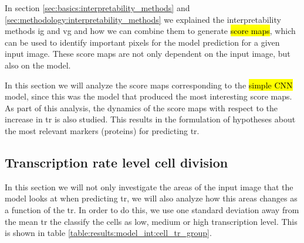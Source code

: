 
\glsresetall
\graphicspath{{./Sections/Results/Resources/}}

In section \ref{sec:basics:interpretability_methods} and \ref{sec:methodology:interpretability_methods} we explained the interpretability methods \gls{ig} and \gls{vg} and how we can combine them to generate \hl{score maps}, which can be used to identify important pixels for the model prediction for a given input image. These score maps are not only dependent on the input image, but also on the model.

In this section we will analyze the score maps corresponding to the \hl{simple CNN} model, since this was the model that produced the most interesting score maps. As part of this analysis, the dynamics of the score maps with respect to the increase in \gls{tr} is also studied. This results in the formulation of hypotheses about the most relevant markers (proteins) for predicting \gls{tr}.

\subsection{Transcription rate level cell division}
\label{sec:results:tr_cell_div}

In this section we will not only investigate the areas of the input image that the model looks at when predicting \gls{tr}, we will also analyze how this areas changes as a function of the \gls{tr}. In order to do this, we use one standard deviation away from the mean \gls{tr} the classify the cells as low, medium or high transcription level. This is shown in table \ref{table:results:model_int:cell_tr_group}.

\setlength{\mylinewidth}{\linewidth-7pt}%
\setlength{\mylengtha}{0.17\mylinewidth-2\arraycolsep}%
\setlength{\mylengthb}{0.29\mylinewidth-2\arraycolsep}%
\setlength{\mylengthc}{0.23\mylinewidth-2\arraycolsep}%
\setlength{\mylengthd}{0.1\mylinewidth-2\arraycolsep}%
\setlength{\mylengthe}{0.18\mylinewidth-2\arraycolsep}%

